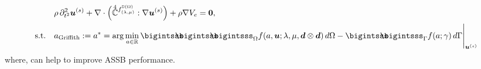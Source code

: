 \documentclass[25pt, a0paper,
portrait,
margin=2mm, 
innermargin=2mm, 
blockverticalspace=7mm, %
colspace=2mm, %
subcolspace=0mm]{tikzposter}
\makeatletter
\newcommand*{\inputfig}[3][htb]{{
    \def\fps@figure{#1}
    \def\DIR{#2}
    \def\LABEL{#3}
    \graphicspath{{\DIR/}}
    
}}
\makeatother
\begin{document}
{\begin{minipage}{0.55\textwidth}
\begin{mdframed}
\begin{align*}
				 & \rho\,
				\partial^2_{t^2}
				\bm{u}^{(s)}
				+
				\nabla \cdot
				\Big(
				\accentset{\scriptstyle 4}{\mathbb{C}}^{f^{\mathbb{D}(\Omega)}_{(\lambda,\mu)}}
				:\nabla\Bu^{(s)}
				\Big)
				+
				\rho\nabla V_{e}
				= \textbf{0},                                                                                                                                                                                                                                                               \\
				\text{s.t.}\quad
				 & a_{\text{Griffith}} := a^{*} = \arg\min_{a\in\mathbb{R}}{\bigintsss\!\!\!\!\!\!\bigintsss\!\!\!\!\!\!\bigintsss_{\Omega} f(a,\bm{u};\lambda,\mu,\bm{d}\otimes\bm{d}) \, d\Omega - \bigintsss\!\!\!\!\!\!\bigintsss_{\Gamma} f(a;\gamma) \, d\Gamma}\Bigg|_{\bm{u}^{(s)}}
			\end{align*}
			where,
			can help to improve ASSB performance.
		\end{mdframed}
	\end{minipage}%
	\hfill
	\begin{minipage}{0.45\textwidth}
		\begin{center}
			\inputfig{floats/routine_woTV_spectral}{routine_woTV_spectral}
		\end{center}
	\end{minipage}%
}
\end{document}
